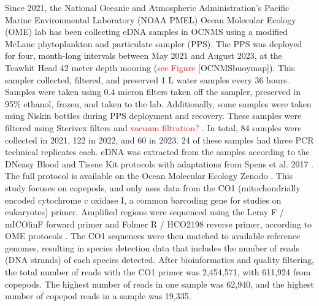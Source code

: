 \documentclass[12pt,twoside]{reedthesis}
\begin{document}
Since 2021, the National Oceanic and Atmospheric Administration's Pacific Marine Environmental Laboratory (NOAA PMEL) Ocean Molecular Ecology (OME) lab has been collecting eDNA samples in OCNMS using a modified McLane phytoplankton and particulate sampler (PPS).  The PPS was deployed for four, month-long intervals between May 2021 and August 2023, at the Teawhit Head 42 meter depth mooring (\textcolor{red}{see Figure} [OCNMSbuoymap]). This sampler collected, filtered, and preserved 1 L water samples every 36 hours. Samples were taken using 0.4 micron filters taken off the sampler, preserved in 95\% ethanol, frozen, and taken to the lab. Additionally, some samples were taken using Niskin bottles during PPS deployment and recovery. These samples were filtered using Sterivex filters and \textcolor{red}{vacuum filtration? }. In total, 84 samples were collected in 2021, 122 in 2022, and 60 in 2023. 24 of these samples had three PCR technical replicates each. eDNA was extracted from the samples according to the DNeasy Blood and Tissue Kit protocols with adaptations from Spens et al. 2017 \autocite{Spens2017}. The full protocol is available on the Ocean Molecular Ecology Zenodo \autocite{Weinrich2025}. This study focuses on copepods, and only uses data from the CO1 (mitochondrially encoded cytochrome c oxidase I, a common barcoding gene for studies on eukaryotes) primer. Amplified regions were sequenced using the  Leray F / mICOlinF forward primer and Folmer R / HCO2198 reverse primer, according to OME protocols \autocite{Gold2024, Spens2017}. The CO1 sequences were then matched to available reference genomes, resulting in species detection data that includes the number of reads (DNA strands) of each species detected. After bioinformatics and quality filtering, the total number of reads with the CO1 primer was 2,454,571, with 611,924 from copepods. The highest number of reads in one sample was 62,940, and the highest number of copepod reads in a sample was 19,335.
\end{document}
